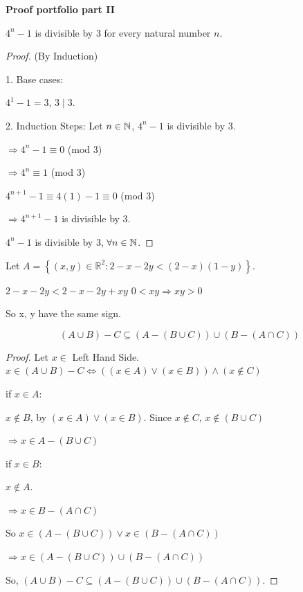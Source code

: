 \documentclass[12pt]{article}
\begin{document}
\vfill
\pagestyle{empty}
\begin{center}
{\bf Proof portfolio part II}
\end{center}
\begin{Lemma} $4^{n}-1$ is divisible by 3 for every natural number $n$.
\end{Lemma}
\begin{proof}
(By Induction) 

1. Base cases: 

$4^1-1 = 3$, $3 \mid 3$.

2. Induction Steps:
Let $n \in \mathbb{N}$, $4^n-1$ is divisible by 3.

$\Rightarrow 4^n-1 \equiv 0$ (mod 3)

$\Rightarrow 4^n \equiv 1$ (mod 3)

$4^{n+1}-1 \equiv 4(1)-1 \equiv 0$ (mod 3)

$\Rightarrow 4^{n+1}-1$ is divisible by 3.

$4^{n}-1$ is divisible by 3, $\forall n \in \mathbb{N}$.
\end{proof}
\vfill
\begin{Definition}
Let $A=\left\{(x, y) \in \mathbb{R}^{2}: 2-x-2 y<(2-x)(1-y)\right\}$.

$2-x-2y< 2-x-2y+xy$
$0<xy \Rightarrow xy>0$

So x, y have the same sign.

\end{Definition}
\vfill
\begin{Lemma} $$
(A \cup B)-C \subseteq(A-(B \cup C)) \cup(B-(A \cap C))
$$
\end{Lemma}
\begin{proof}
Let $x \in$ Left Hand Side.
$x \in (A \cup B)-C \iff ((x \in A) \vee (x \in B)) \wedge (x \notin C)$ 

if $x \in A$:

$x\notin B$, by $(x \in A) \vee (x \in B)$.
Since $x \notin C$, $x\notin (B \cup C)$

$\Rightarrow x\in A - (B \cup C)$

if $x \in B$:

$x\notin A$.

$\Rightarrow x \in B - (A \cap C)$
 
So $x \in (A-(B \cup C)) \vee x \in (B-(A \cap C))$

$\Rightarrow x \in (A-(B \cup C)) \cup(B-(A \cap C))$

So, $(A \cup B)-C \subseteq(A-(B \cup C)) \cup(B-(A \cap C))$.

\end{proof}
\end{document}
